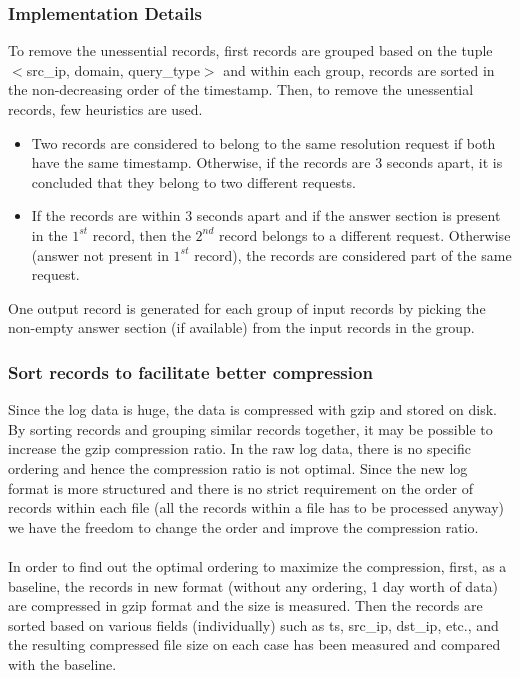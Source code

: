 \documentclass[11pt,a4paper]{article}
\newcommand{\resitem}[1]{\item #1 \vspace{-7pt}}
\begin{document}
\subsubsection{Implementation Details}
To remove the unessential records, first records are grouped based on the tuple \\$<$src\_ip, domain, query\_type$>$ and within each group, records are sorted in the non-decreasing order of the timestamp. Then, to remove the unessential records, few heuristics are used.
\begin{itemize}
	\resitem {Two records are considered to belong to the same resolution request if both have the same timestamp. Otherwise, if the records are 3 seconds apart, it is concluded that they belong to two different requests.}
	\resitem {If the records are within 3 seconds apart and if the answer section is present in the $1^{st}$ record, then the $2^{nd}$ record belongs to a different request. Otherwise (answer not present in $1^{st}$ record), the records are considered part of the same request.}
\end{itemize}
\noindent
One output record is generated for each group of input records by picking the non-empty answer section (if available) from the input records in the group.

\subsubsection{Sort records to facilitate better compression}
Since the log data is huge, the data is compressed with gzip and stored on disk. By sorting records and grouping similar records together, it may be possible to increase the gzip compression ratio. In the raw log data, there is no specific ordering and hence the compression ratio is not optimal. Since the new log format is more structured and there is no strict requirement on the order of records within each file (all the records within a file has to be processed anyway) we have the freedom to change the order and improve the compression ratio.
\\\\
In order to find out the optimal ordering to maximize the compression, first, as a baseline, the records in new format (without any ordering, 1 day worth of data) are compressed in gzip format and the size is measured. Then the records are sorted based on various fields (individually) such as ts, src\_ip, dst\_ip, etc., and the resulting compressed file size on each case has been measured and compared with the baseline.
\end{document}

